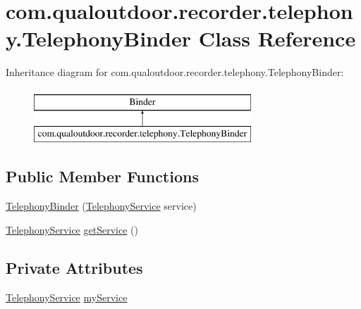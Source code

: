 \hypertarget{classcom_1_1qualoutdoor_1_1recorder_1_1telephony_1_1TelephonyBinder}{\section{com.\-qualoutdoor.\-recorder.\-telephony.\-Telephony\-Binder Class Reference}
\label{classcom_1_1qualoutdoor_1_1recorder_1_1telephony_1_1TelephonyBinder}
}
Inheritance diagram for com.\-qualoutdoor.\-recorder.\-telephony.\-Telephony\-Binder\-:\begin{figure}[H]
\begin{center}
\leavevmode
\includegraphics[height=2.000000cm]{classcom_1_1qualoutdoor_1_1recorder_1_1telephony_1_1TelephonyBinder}
\end{center}
\end{figure}
\subsection*{Public Member Functions}
\begin{DoxyCompactItemize}
\item 
\hyperlink{classcom_1_1qualoutdoor_1_1recorder_1_1telephony_1_1TelephonyBinder_afc6a0e5ef46d92a4bf0c9e2ee7df8a33}{Telephony\-Binder} (\hyperlink{classcom_1_1qualoutdoor_1_1recorder_1_1telephony_1_1TelephonyService}{Telephony\-Service} service)
\item 
\hyperlink{classcom_1_1qualoutdoor_1_1recorder_1_1telephony_1_1TelephonyService}{Telephony\-Service} \hyperlink{classcom_1_1qualoutdoor_1_1recorder_1_1telephony_1_1TelephonyBinder_acdfebeb669e80bdf37dec7b4dd65e73b}{get\-Service} ()
\end{DoxyCompactItemize}
\subsection*{Private Attributes}
\begin{DoxyCompactItemize}
\item 
\hyperlink{classcom_1_1qualoutdoor_1_1recorder_1_1telephony_1_1TelephonyService}{Telephony\-Service} \hyperlink{classcom_1_1qualoutdoor_1_1recorder_1_1telephony_1_1TelephonyBinder_a864035a7cb42e95815445f9d6c345492}{my\-Service}
\end{DoxyCompactItemize}


